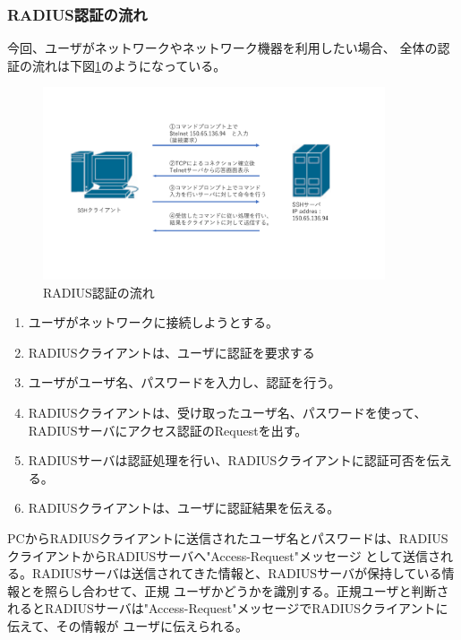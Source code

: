 \documentclass[11pt,a4j,titlepage]{jreport}
\begin{document}
\subsubsection*{RADIUS認証の流れ}
今回、ユーザがネットワークやネットワーク機器を利用したい場合、
全体の認証の流れは下図\ref{RADIUS_Authentication}のようになっている。
\begin{figure}[h]
    \begin{center}
        \includegraphics[width=0.9\textwidth, page=19]{graphs/network_archtecture.pdf}
        \caption{RADIUS認証の流れ}
        \label{RADIUS_Authentication}
    \end{center}
\end{figure}
\begin{enumerate}
    \setlength{\parskip}{0.1cm} %
    \setlength{\itemsep}{0.1cm} 

    \item ユーザがネットワークに接続しようとする。
    \item RADIUSクライアントは、ユーザに認証を要求する
    \item ユーザがユーザ名、パスワードを入力し、認証を行う。
    \item RADIUSクライアントは、受け取ったユーザ名、パスワードを使って、RADIUSサーバにアクセス認証のRequestを出す。
    \item RADIUSサーバは認証処理を行い、RADIUSクライアントに認証可否を伝える。
    \item RADIUSクライアントは、ユーザに認証結果を伝える。

\end{enumerate}




PCからRADIUSクライアントに送信されたユーザ名とパスワードは、RADIUSクライアントからRADIUSサーバへ"Access-Request"メッセージ
として送信される。RADIUSサーバは送信されてきた情報と、RADIUSサーバが保持している情報とを照らし合わせて、正規
ユーザかどうかを識別する。正規ユーザと判断されるとRADIUSサーバは"Access-Request"メッセージでRADIUSクライアントに伝えて、その情報が
ユーザに伝えられる。
\\
\fi
\end{document}
